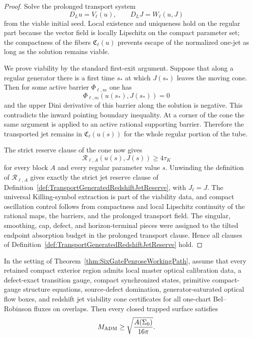 \begin{proof}
Solve the prolonged transport system
\[
    D_Lu=V_\ell(u),\qquad D_LJ=W_\ell(u,J)
\]
from the viable initial seed.  Local existence and uniqueness hold on the
regular part because the vector field is locally Lipschitz on the compact
parameter set; the compactness of the fibers $\mathfrak C_\ell(u)$ prevents
escape of the normalized one-jet as long as the solution remains viable.

We prove viability by the standard first-exit argument.  Suppose that along a
regular generator there is a first time $s_*$ at which
$J(s_*)$ leaves the moving cone.  Then for some active barrier
$\Phi_{\ell,m}$ one has
\[
    \Phi_{\ell,m}(u(s_*),J(s_*))=0
\]
and the upper Dini derivative of this barrier along the solution is negative.
This contradicts the inward pointing boundary inequality.  At a corner of the
cone the same argument is applied to an active rational supporting barrier.
Therefore the transported jet remains in
$\mathfrak C_\ell(u(s))$ for the whole regular portion of the tube.

The strict reserve clause of the cone now gives
\[
    \mathcal R_{\ell,A}(u(s),J(s))\ge4\tau_K
\]
for every block $A$ and every regular parameter value $s$.  Unwinding the
definition of $\mathcal R_{\ell,A}$ gives exactly the strict jet reserve clause
of Definition~\ref{def:TransportGeneratedRedshiftJetReserve}, with
$J_\ell=J$.  The universal Killing-symbol extraction is part of the viability
data, and compact oscillation control follows from compactness and local
Lipschitz continuity of the rational maps, the barriers, and the prolonged
transport field.  The singular, smoothing, cap, defect, and horizon-terminal
pieces were assigned to the tilted endpoint absorption budget in the prolonged
transport clause.  Hence all clauses of
Definition~\ref{def:TransportGeneratedRedshiftJetReserve} hold.
\end{proof}

\begin{corollary}\label{cor:ViabilityConeLocalRoutePenrose}
In the setting of Theorem~\ref{thm:SixGatePenroseWorkingPath}, assume that every
retained compact exterior region admits local master optical calibration data, a
defect-exact transition gauge, compact synchronized states, primitive
compact-gauge structure equations, source-defect domination, generator-saturated
optical flow boxes, and redshift jet viability cone certificates for all
one-chart Bel--Robinson fluxes on overlaps. Then every closed trapped surface
satisfies
\[
    M_{\mathrm{ADM}}\ge \sqrt{\frac{A(\Sigma_0)}{16\pi}} .
\]
\end{corollary}


